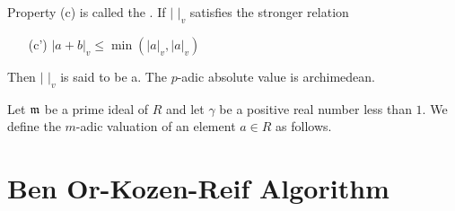 Property (c) is called the .  If $|\,\,|_v$
satisfies the stronger relation
\begin{itemize}
\item[(c')] $|a + b|_v \le \min(|a|_v, |a|_v)$
\end{itemize}
Then $|\,\,|_v$ is said to be a.  The
$p$-adic absolute value is archimedean.

Let ${\frak m}$ be a prime ideal of $R$ and let $\gamma$ be a positive
real number less than $1$.  We define the $m$-adic valuation of an
element $a \in R$ as follows.  



\section{Ben Or-Kozen-Reif Algorithm}



